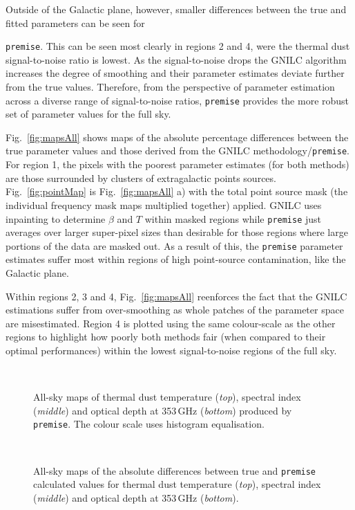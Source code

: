 \documentclass[a4paper,fleqn,usenatbib]{mnras}
\begin{document}
Outside of the Galactic plane, however, smaller differences between the true and fitted parameters can be seen for {{\texttt{premise}}. This can be seen most clearly in regions 2 and 4, were the thermal dust signal-to-noise ratio is lowest. As the signal-to-noise drops the GNILC algorithm increases the degree of smoothing and their parameter estimates deviate further from the true values. Therefore, from the perspective of parameter estimation across a diverse range of signal-to-noise ratios, {\texttt{premise}} provides the more robust set of parameter values for the full sky.  

Fig.~\ref{fig:mapsAll} shows maps of the absolute percentage differences between the true parameter values and those derived from the GNILC methodology/{\texttt{premise}}. For region 1, the pixels with the poorest parameter estimates (for both methods) are those surrounded by clusters of extragalactic points sources. Fig.~\ref{fig:pointMap} is Fig.~\ref{fig:mapsAll} a) with the total point source mask (the individual frequency mask maps multiplied together) applied. GNILC uses inpainting to determine $\beta$ and $T$ within masked regions while {\texttt{premise}} just averages over larger super-pixel sizes than desirable for those regions where large portions of the data are masked out. As a result of this, the {\texttt{premise}} parameter estimates suffer most within regions of high point-source contamination, like the Galactic plane. 

Within regions 2, 3 and 4, Fig.~\ref{fig:mapsAll} reenforces the fact that the GNILC estimations suffer from over-smoothing as whole patches of the parameter space are misestimated. Region 4 is plotted using the same colour-scale as the other regions to highlight how poorly both methods fair (when compared to their optimal performances) within the lowest signal-to-noise regions of the full sky. 


\begin{figure}
\centering
{}\,
\,
\,
\caption{All-sky maps of thermal dust temperature ({\it{top}}), spectral index ({\it{middle}}) and optical depth at 353\,GHz  ({\it{bottom}}) produced by {\texttt{premise}}. The colour scale uses histogram equalisation.}
\label{fig:paramsmaps}
\end{figure}

\begin{figure}
\centering
{}\,
\,
\,
\caption{All-sky maps of the absolute differences between true and {\texttt{premise}} calculated values for thermal dust temperature ({\it{top}}), spectral index ({\it{middle}}) and optical depth at 353\,GHz  ({\it{bottom}}).}
\label{fig:paramsmapsDiff}
\end{figure}

}
\end{document}
